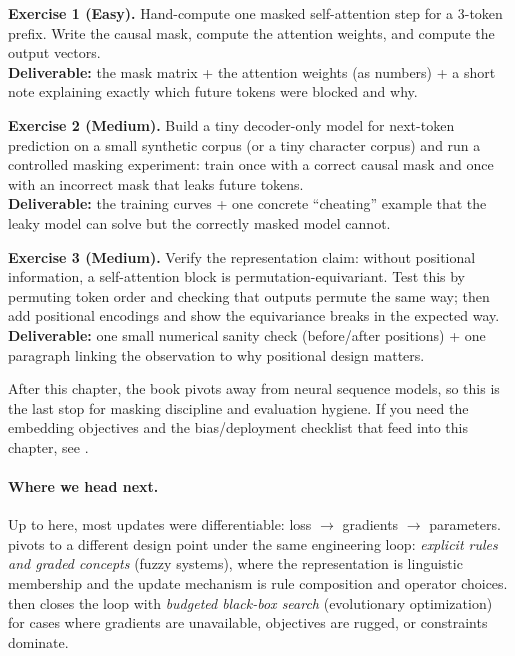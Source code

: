 \clearpage
\begin{tcolorbox}[summarybox, breakable, title={Exercises}]
\textbf{Exercise 1 (Easy).} Hand-compute one masked self-attention step for a 3-token prefix. Write the causal mask, compute the attention weights, and compute the output vectors. \\
\textbf{Deliverable:} the mask matrix + the attention weights (as numbers) + a short note explaining exactly which future tokens were blocked and why.

\smallskip
\textbf{Exercise 2 (Medium).} Build a tiny decoder-only model for next-token prediction on a small synthetic corpus (or a tiny character corpus) and run a controlled masking experiment: train once with a correct causal mask and once with an incorrect mask that leaks future tokens. \\
\textbf{Deliverable:} the training curves + one concrete ``cheating'' example that the leaky model can solve but the correctly masked model cannot.

\smallskip
\textbf{Exercise 3 (Medium).} Verify the representation claim: without positional information, a self-attention block is permutation-equivariant. Test this by permuting token order and checking that outputs permute the same way; then add positional encodings and show the equivariance breaks in the expected way. \\
\textbf{Deliverable:} one small numerical sanity check (before/after positions) + one paragraph linking the observation to why positional design matters.
\end{tcolorbox}

\begin{tcolorbox}[summarybox, title={If you are skipping ahead}]
After this chapter, the book pivots away from neural sequence models, so this is the last stop for masking discipline and evaluation hygiene. If you need the embedding objectives and the bias/deployment checklist that feed into this chapter, see .
\end{tcolorbox}

\medskip
\paragraph{Where we head next.}
Up to here, most updates were differentiable: loss \(\rightarrow\) gradients \(\rightarrow\) parameters.  pivots to a different design point under the same engineering loop: \emph{explicit rules and graded concepts} (fuzzy systems), where the representation is linguistic membership and the update mechanism is rule composition and operator choices.  then closes the loop with \emph{budgeted black\hyp{}box search} (evolutionary optimization) for cases where gradients are unavailable, objectives are rugged, or constraints dominate.
